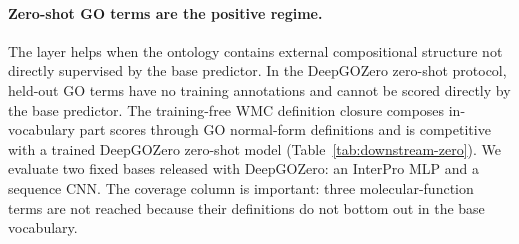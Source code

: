 \documentclass[letterpaper]{article}
\begin{document}
\begin{table}[t]\centering
\caption{Within-vocabulary GO prediction with a fixed MLP backbone. Fmax changes little because these targets are already supervised and annotation propagation is already reflected in the labels.}\label{tab:downstream-within}
\footnotesize
\setlength{\tabcolsep}{3pt}
\end{table}

\paragraph{Zero-shot GO terms are the positive regime.}
The layer helps when the ontology contains external compositional structure not directly supervised by the base predictor. In the DeepGOZero zero-shot protocol, held-out GO terms have no training annotations and cannot be scored directly by the base predictor. The training-free WMC definition closure composes in-vocabulary part scores through GO normal-form definitions and is competitive with a trained DeepGOZero zero-shot model (Table~\ref{tab:downstream-zero}). We evaluate two fixed bases released with DeepGOZero: an InterPro MLP and a sequence CNN. The coverage column is important: three molecular-function terms are not reached because their definitions do not bottom out in the base vocabulary.

\begin{table}[t]\centering
\caption{DeepGOZero curated zero-shot GO terms. The metric is mean per-term ROC-AUC over reached/evaluable terms. WMC uses no zero-shot training; it composes fixed base-predictor scores through ontology definitions.}\label{tab:downstream-zero}
\footnotesize
\setlength{\tabcolsep}{3pt}
\end{table}
\end{document}
